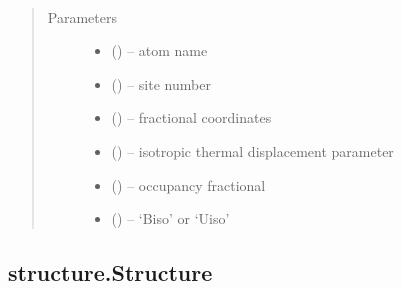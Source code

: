 \documentclass[letterpaper,10pt,english]{sphinxmanual}
\begin{document}
\begin{fulllineitems}
\begin{fulllineitems}
\label{\detokenize{rst/structure:mstack.structure.Atom.__init__}}~\begin{quote}\begin{description}
\item[{Parameters}] \leavevmode\begin{itemize}
\item {} 
 (\sphinxstyleliteralemphasis{*}) -- atom name

\item {} 
 (\sphinxstyleliteralemphasis{*}) -- site number

\item {} 
\sphinxstyleliteralstrong{, }\sphinxstyleliteralstrong{, } (\sphinxstyleliteralemphasis{*}) -- fractional coordinates

\item {} 
 (\sphinxstyleliteralemphasis{*}) -- isotropic thermal displacement parameter

\item {} 
 (\sphinxstyleliteralemphasis{*}) -- occupancy fractional

\item {} 
 (\sphinxstyleliteralemphasis{*}) -- `Biso' or `Uiso'

\end{itemize}

\end{description}\end{quote}

\end{fulllineitems}


\end{fulllineitems}



\subsection{structure.Structure}
\label{\detokenize{rst/structure:structure-structure}}
\end{document}
